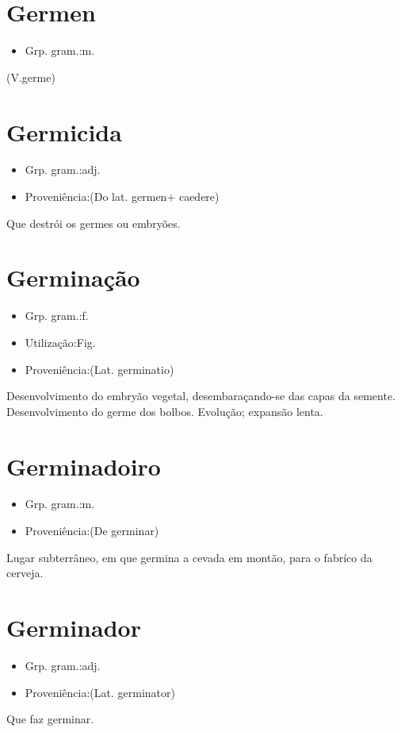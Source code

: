 \section{Germen}
\begin{itemize}
\item {Grp. gram.:m.}
\end{itemize}
(V.germe)
\section{Germicida}
\begin{itemize}
\item {Grp. gram.:adj.}
\end{itemize}
\begin{itemize}
\item {Proveniência:(Do lat. \textunderscore germen\textunderscore  + \textunderscore caedere\textunderscore )}
\end{itemize}
Que destrói os germes ou embryões.
\section{Germinação}
\begin{itemize}
\item {Grp. gram.:f.}
\end{itemize}
\begin{itemize}
\item {Utilização:Fig.}
\end{itemize}
\begin{itemize}
\item {Proveniência:(Lat. \textunderscore germinatio\textunderscore )}
\end{itemize}
Desenvolvimento do embryão vegetal, desembaraçando-se das capas da semente.
Desenvolvimento do germe dos bolbos.
Evolução; expansão lenta.
\section{Germinadoiro}
\begin{itemize}
\item {Grp. gram.:m.}
\end{itemize}
\begin{itemize}
\item {Proveniência:(De \textunderscore germinar\textunderscore )}
\end{itemize}
Lugar subterrâneo, em que germina a cevada em montão, para o fabríco da cerveja.
\section{Germinador}
\begin{itemize}
\item {Grp. gram.:adj.}
\end{itemize}
\begin{itemize}
\item {Proveniência:(Lat. \textunderscore germinator\textunderscore )}
\end{itemize}
Que faz germinar.
